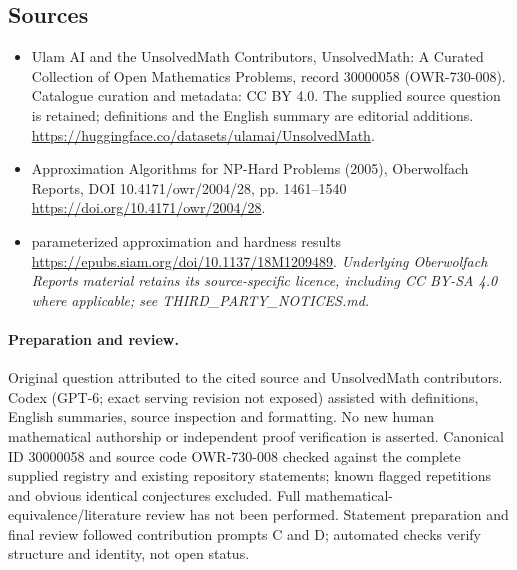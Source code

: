 \documentclass[11pt]{article}
\begin{document}
\subsection{Sources}
\begin{itemize}
\item[\hypertarget{source:30000058:1}{S1}] Ulam AI and the UnsolvedMath Contributors, UnsolvedMath: A Curated Collection of Open Mathematics Problems, record 30000058 (OWR-730-008). Catalogue curation and metadata: CC BY 4.0. The supplied source question is retained; definitions and the English summary are editorial additions.
\url{https://huggingface.co/datasets/ulamai/UnsolvedMath}.
\item[\hypertarget{source:30000058:2}{S2}] Approximation Algorithms for NP-Hard Problems (2005), Oberwolfach Reports, DOI 10.4171/owr/2004/28, pp. 1461--1540
\url{https://doi.org/10.4171/owr/2004/28}.
\item[\hypertarget{source:30000058:3}{S3}] parameterized approximation and hardness results
\url{https://epubs.siam.org/doi/10.1137/18M1209489}.
\textit{Underlying Oberwolfach Reports material retains its source-specific licence, including CC BY-SA 4.0 where applicable; see THIRD\_PARTY\_NOTICES.md.}
\end{itemize}
\paragraph{Preparation and review.}
Original question attributed to the cited source and UnsolvedMath contributors. Codex (GPT-6; exact serving revision not exposed) assisted with definitions, English summaries, source inspection and formatting. No new human mathematical authorship or independent proof verification is asserted. Canonical ID 30000058 and source code OWR-730-008 checked against the complete supplied registry and existing repository statements; known flagged repetitions and obvious identical conjectures excluded. Full mathematical-equivalence/literature review has not been performed. Statement preparation and final review followed contribution prompts C and D; automated checks verify structure and identity, not open status.
\label{end:30000058}
\end{document}
